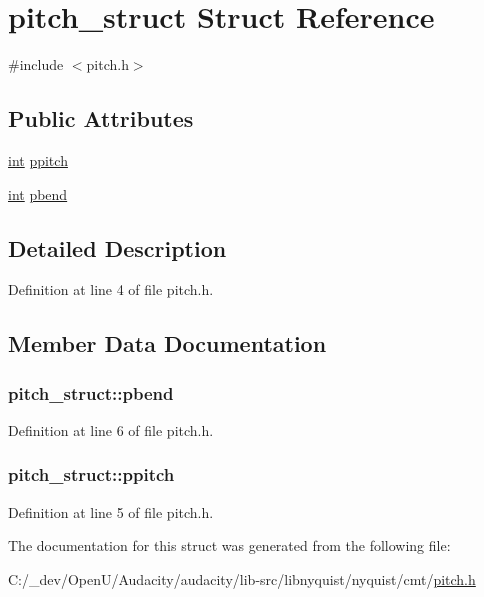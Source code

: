 \hypertarget{structpitch__struct}{}\section{pitch\+\_\+struct Struct Reference}
\label{structpitch__struct}


{\ttfamily \#include $<$pitch.\+h$>$}

\subsection*{Public Attributes}
\begin{DoxyCompactItemize}
\item 
\hyperlink{xmltok_8h_a5a0d4a5641ce434f1d23533f2b2e6653}{int} \hyperlink{structpitch__struct_a2aa15340985b39d8a8ac127291df3d47}{ppitch}
\item 
\hyperlink{xmltok_8h_a5a0d4a5641ce434f1d23533f2b2e6653}{int} \hyperlink{structpitch__struct_a265cb0eee9c3e149568bb7c17397eb7b}{pbend}
\end{DoxyCompactItemize}


\subsection{Detailed Description}


Definition at line 4 of file pitch.\+h.



\subsection{Member Data Documentation}
\subsubsection[{\texorpdfstring{pbend}{pbend}}]{ pitch\+\_\+struct\+::pbend}\hypertarget{structpitch__struct_a265cb0eee9c3e149568bb7c17397eb7b}{}\label{structpitch__struct_a265cb0eee9c3e149568bb7c17397eb7b}


Definition at line 6 of file pitch.\+h.

\subsubsection[{\texorpdfstring{ppitch}{ppitch}}]{ pitch\+\_\+struct\+::ppitch}\hypertarget{structpitch__struct_a2aa15340985b39d8a8ac127291df3d47}{}\label{structpitch__struct_a2aa15340985b39d8a8ac127291df3d47}


Definition at line 5 of file pitch.\+h.



The documentation for this struct was generated from the following file\+:\begin{DoxyCompactItemize}
\item 
C\+:/\+\_\+dev/\+Open\+U/\+Audacity/audacity/lib-\/src/libnyquist/nyquist/cmt/\hyperlink{pitch_8h}{pitch.\+h}\end{DoxyCompactItemize}
